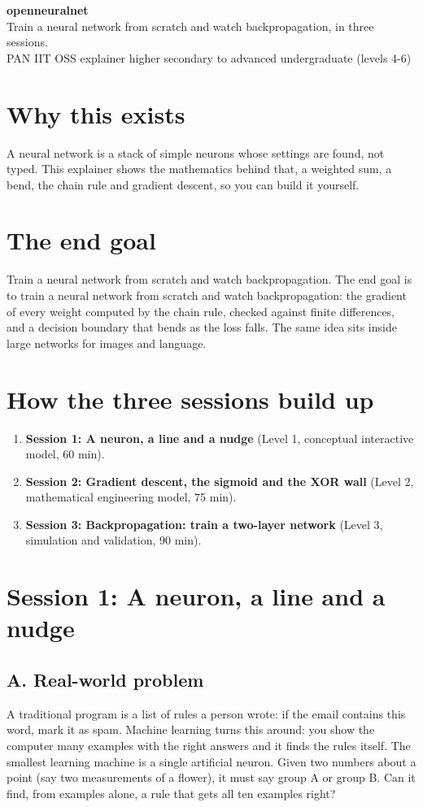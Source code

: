 \documentclass[11pt,a4paper]{article}
\begin{document}
\begin{center}{\LARGE\bfseries openneuralnet}\\[0.4em]{\large Train a neural network from scratch and watch backpropagation, in three sessions.}\\[0.2em]\small PAN IIT OSS explainer \textbullet{} higher secondary to advanced undergraduate (levels 4-6)\end{center}

\section*{Why this exists}
A neural network is a stack of simple neurons whose settings are found, not typed. This explainer shows the mathematics behind that, a weighted sum, a bend, the chain rule and gradient descent, so you can build it yourself.

\section*{The end goal}
Train a neural network from scratch and watch backpropagation. The end goal is to train a neural network from scratch and watch backpropagation: the gradient of every weight computed by the chain rule, checked against finite differences, and a decision boundary that bends as the loss falls. The same idea sits inside large networks for images and language.

\section*{How the three sessions build up}
\begin{enumerate}[nosep]
\item \textbf{Session 1: A neuron, a line and a nudge} (Level 1, conceptual interactive model, 60 min).
\item \textbf{Session 2: Gradient descent, the sigmoid and the XOR wall} (Level 2, mathematical engineering model, 75 min).
\item \textbf{Session 3: Backpropagation: train a two-layer network} (Level 3, simulation and validation, 90 min).
\end{enumerate}

\section{Session 1: A neuron, a line and a nudge}

\subsection*{A. Real-world problem}
A traditional program is a list of rules a person wrote: if the email contains this word, mark it as spam. Machine learning turns this around: you show the computer many examples with the right answers and it finds the rules itself. The smallest learning machine is a single artificial neuron. Given two numbers about a point (say two measurements of a flower), it must say group A or group B. Can it find, from examples alone, a rule that gets all ten examples right?
\end{document}
